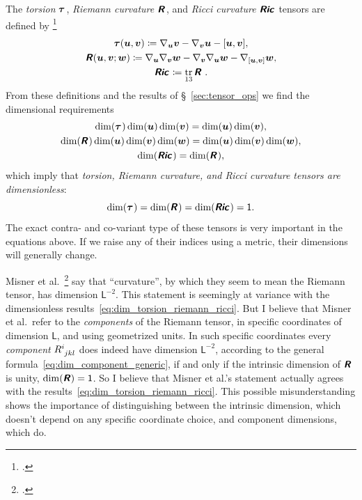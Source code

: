 \documentclass[\ifafour a4paper,12pt,\else a5paper,10pt,\fi%
onecolumn,oneside,article,%
british%
]{memoir}
\makeatletter
\theoremstyle{remark}
\theoremstyle{innote}
\newcommand*{\mathte}[1]{\textbf{\textit{\textsf{#1}}}}
\newcommand*{\citep}{\footcites}
\DeclareMathOperator{\tr}{tr}%
\newcommand*{\defd}{\coloneqq}
\DeclarePairedDelimiter\clcl{[}{]}
\renewcommand*{\|}[1][]{\nonscript\,#1\vert\nonscript\;\mathopen{}}
\newcommand*{\sect}{\S}%
\newcommand*{\etal}{{et al.}}
\newcommand*{\q}{}%
\DeclareRobustCommand*{\q}{%
  \mathbin{\mathpalette\bigcdot@{}}%
}
\newcommand*{\bigcdot@scalefactor}{0.7}
\newcommand*{\bigcdot@widthfactor}{1.5}
\newcommand*{\bigcdot@}[2]{%
  \sbox0{$#1\vcenter{}$}%
  \sbox2{$#1\cdot\m@th$}%
  \hbox to \bigcdot@widthfactor\wd2{%
    \hfil
    \raise\ht0\hbox{%
      \scalebox{\bigcdot@scalefactor}{%
        \lower\ht0\hbox{$#1\bullet\m@th$}%
      }%
    }%
    \hfil
  }%
}
\newcommand*{\Un}{\textsf{1}}
\newcommand*{\Le}{\textsf{L}}
\newcommand*{\yR}{\mathte{R}}
\newcommand*{\yRi}{\mathte{Ric}}
\newcommand*{\yTo}{\bm{\tau}}
\newcommand*{\yv}{\bm{v}}
\newcommand*{\yu}{\bm{u}}
\newcommand*{\yw}{\bm{w}}
\renewcommand*{\i}{\indices}
\newcommand*{\nab}{\nabla}
\makeatother
\begin{document}
The \emph{torsion} $\yTo\i{^{\q}_{\q\q}}$, \emph{Riemann
  curvature} $\yR\i{^{\q}_{\q\q\q}}$, and \emph{Ricci
  curvature} $\yRi\i{_{\q\q}}$ tensors are defined by
\citep[\sect~V.B.1]{choquetbruhatetal1977_r1996}
\begin{gather}
  \label{eq:torsion_eq}
\yTo(\yu,\yv) \defd \nab_{\yu}\yv - \nab_{\yv}\yu - \clcl{\yu,\yv},
\\
\yR(\yu,\yv;\yw) \defd
\nab_{\yu}\nab_{\yv}\yw - \nab_{\yv}\nab_{\yu}\yw
- \nab_{\clcl{\yu,\yv}}\yw,
  \label{eq:riemann_eq}  
\\
\yRi\i{_{\q\q}} \defd \tr_{13} \yR\i{^{\q}_{\q\q\q}} \;.
  \label{eq:ricci_eq}  
\end{gather}
From these definitions and the results of \sect~\ref{sec:tensor_ops} we
find the dimensional requirements
\begin{gather}
  \label{eq:torsion_eq_dim}
\dim(\yTo\i{^{\q}_{\q\q}})\dim(\yu)\dim(\yv) = \dim(\yu) \dim(\yv),
\\
\dim(\yR\i{^{\q}_{\q\q\q}})\dim(\yu)\dim(\yv)\dim(\yw) =
\dim(\yu)\dim(\yv)\dim(\yw),
\label{eq:riemann_eq_dim}
\\
\dim(\yRi\i{_{\q\q}}) = \dim(\yR\i{^{\q}_{\q\q\q}}),
  \label{eq:ricci_eq_dim}  
\end{gather}
which imply that \emph{torsion, Riemann curvature, and Ricci curvature
  tensors are dimensionless}:
\begin{equation}
  \label{eq:dim_torsion_riemann_ricci}
  \dim(\yTo\i{^{\q}_{\q\q}}) =
   \dim(\yR\i{^{\q}_{\q\q\q}}) =
   \dim(\yRi\i{_{\q\q}}) =\Un.
\end{equation}
The exact contra- and co-variant type of these tensors is very important in
the equations above. If we raise any of their indices using a metric, their
dimensions will generally change.

Misner \etal\ \citep[p.~35%
]{misneretal1970_r1973} say that \enquote{curvature}, by which they seem to
mean the Riemann tensor, has dimension $\Le^{-2}$. This statement is
seemingly at variance with the dimensionless
results~\eqref{eq:dim_torsion_riemann_ricci}. But I believe that Misner
\etal\ refer to the \emph{components} of the Riemann tensor, in specific
coordinates of dimension $\Le$, and using geometrized units. In such
specific coordinates every \emph{component} $R\i{^{i}_{jkl}}$ does indeed
have dimension $\Le^{-2}$, according to the general
formula~\eqref{eq:dim_component_generic}, if and only if the intrinsic
dimension of $\yR$ is unity, $\dim(\yR)=\Un$. So I believe that Misner
\etal's statement actually agrees with the
results~\eqref{eq:dim_torsion_riemann_ricci}. This possible
misunderstanding shows the importance of distinguishing between the
intrinsic dimension, which doesn't depend on any specific coordinate
choice, and component dimensions, which do.
\end{document}
